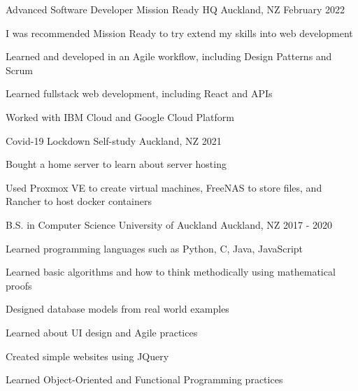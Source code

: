 

\begin{cventries}

  \cventry
    {Advanced Software Developer}
    {Mission Ready HQ}
    {Auckland, NZ}
    {February 2022}
    {
      \begin{cvitems}
        \item {I was recommended Mission Ready to try extend my skills into web development}
        \item {Learned and developed in an Agile workflow, including Design Patterns and Scrum}
        \item {Learned fullstack web development, including React and APIs}
        \item {Worked with IBM Cloud and Google Cloud Platform}
      \end{cvitems}
    }

  \cventry
    {Covid-19 Lockdown}
    {Self-study}
    {Auckland, NZ}
    {2021}
    {
      \begin{cvitems}
        \item {Bought a home server to learn about server hosting}
        \item {Used Proxmox VE to create virtual machines, FreeNAS to store files, and Rancher to host docker containers}
      \end{cvitems}
    }

  \cventry
    {B.S. in Computer Science} %
    {University of Auckland} %
    {Auckland, NZ} %
    {2017 - 2020} %
    {
      \begin{cvitems} %
        \item {Learned programming languages such as Python, C, Java, JavaScript}
        \item {Learned basic algorithms and how to think methodically using mathematical proofs}
        \item {Designed database models from real world examples}
        \item {Learned about UI design and Agile practices}
        \item {Created simple websites using JQuery}
        \item {Learned Object-Oriented and Functional Programming practices}
      \end{cvitems}
    }

\end{cventries}
